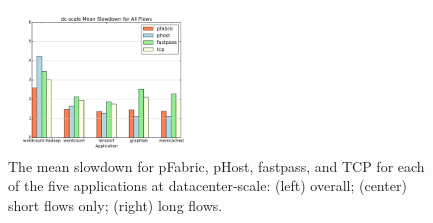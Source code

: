 %
\begin{figure}
  \centering
    \includegraphics[width = 2in]{img/fig12_dc-scale_slowdowns} 
  \caption{\small{The mean slowdown for pFabric, pHost, fastpass, and TCP for each of the five applications at datacenter-scale: (left) overall; (center) short flows only; (right) long flows.}}
  \label{fig:phostp-ds}
\end{figure}
%

